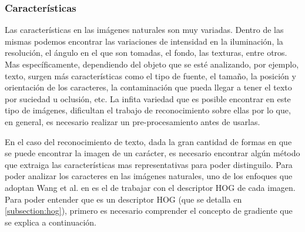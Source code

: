 \subsubsection{Características}

Las características en las imágenes naturales son muy variadas. Dentro de las mismas podemos encontrar las variaciones de intensidad en la iluminación, la resolución, el ángulo en el que son tomadas, el fondo, las texturas, entre otros. Mas específicamente, dependiendo del objeto que se esté analizando, por ejemplo, texto, surgen más características como el tipo de fuente, el tamaño, la posición y orientación de los caracteres, la contaminación que pueda llegar a tener el texto por suciedad u oclusión, etc. La infita variedad que es posible encontrar en este tipo de imágenes, dificultan el trabajo de reconocimiento sobre ellas por lo que, en general, es necesario realizar un pre-procesamiento antes de usarlas.

	En el caso del reconocimiento de texto, dada la gran cantidad de formas en que se puede encontrar la imagen de un carácter, es necesario encontrar algún método que extraiga las características mas representativas para poder distinguilo. Para poder analizar los caracteres en las imágenes naturales, uno de los enfoques que adoptan Wang et al. en \cite{wang} es el de trabajar con el descriptor HOG de cada imagen. Para poder entender que es un descriptor HOG (que se detalla en \ref{subsection:hog}), primero es necesario comprender el concepto de gradiente que se explica a continuación.
